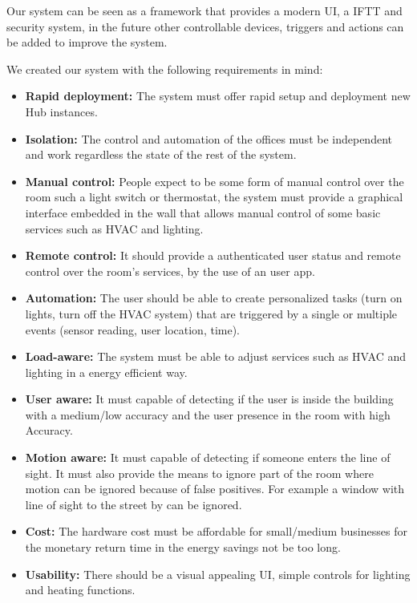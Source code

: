 Our system can be seen as a framework that provides a modern \ac{UI}, a \ac{IFTT} and security system, in the future other controllable devices, triggers and actions can be added to improve the system.



We created our system with the following requirements in mind:

\begin{itemize}
  \item \textbf{Rapid deployment:} The system must offer rapid setup and deployment new Hub instances.
  
  \item \textbf{Isolation:} The control and automation of the offices must be independent and work regardless the state of the rest of the system.
  
  \item \textbf{Manual control:} People expect to be some form of manual control over the room such a light switch or thermostat, the system must provide a graphical interface embedded in the wall that allows manual control of some basic services such as \ac{HVAC} and lighting.
  
  \item \textbf{Remote control:} It should provide a authenticated user status and remote control over the room's services, by the use of an user app.
  
  \item \textbf{Automation:} The user should be able to create personalized tasks (turn on lights, turn off the \ac{HVAC} system) that are triggered by a single or multiple events (sensor reading, user location, time).
  
  \item \textbf{Load-aware:} The system must be able to adjust services such as HVAC and lighting in a energy efficient way.
  
  \item \textbf{User aware:} It must capable of detecting if the user is inside the building with a medium/low accuracy and the user presence in the room with high Accuracy.
  
  \item \textbf{Motion aware:} It must capable of detecting if someone enters the line of sight. It must also provide the means to ignore part of the room where motion can be ignored because of false positives. For example a window with line of sight to the street by can be ignored.
  
  
  \item \textbf{Cost:} The hardware cost must be affordable for small/medium businesses for the monetary return time in the energy savings not be too long.
  
  \item \textbf{Usability:} There should be a visual appealing \ac{UI}, simple controls for lighting and heating functions.
    

\end{itemize}
